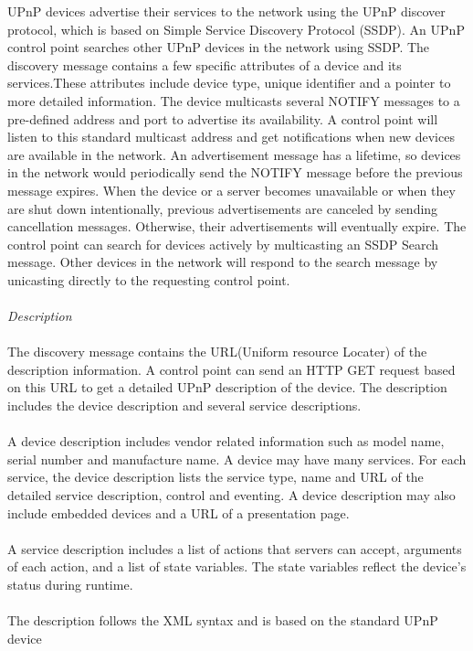 UPnP devices advertise their services to the network using the UPnP discover protocol, which is based on 
Simple Service Discovery Protocol (SSDP). An UPnP control point searches other UPnP devices in the network using SSDP. The discovery message contains a few specific attributes 
of a device and its services.These attributes include device type, unique identifier and a 
pointer to more detailed information. The device multicasts several NOTIFY
messages to a pre-defined address and port to advertise its availability. A control point will listen to this standard multicast address and get 
notifications when new devices are available in the network. 
An advertisement message has a lifetime, so devices in the network would periodically send 
the NOTIFY message before the previous message expires. When the device or a server becomes unavailable or when they are shut down intentionally, previous advertisements are canceled by sending cancellation messages. Otherwise, their advertisements will eventually expire. 
The control point can search for devices actively by multicasting an SSDP Search message. Other devices 
in the network will respond to the search message by unicasting directly to the
requesting control point. \\
\\
\emph{Description} \\
\\ 
The discovery message contains the URL(Uniform resource Locater) of the
description information. A control point can send an HTTP GET request based on
this URL to get a detailed UPnP description of the device. The description includes the device description and several service descriptions. \\
\\
A device description includes vendor related information such as model name,
 serial number and manufacture name. A device may have many services. For each service, the device description lists 
the service type, name and URL of the detailed service description, control and eventing. A device 
description may also include embedded devices and a URL of a presentation
page.\\
\\
A service description includes a list of actions that servers can accept, arguments of each action, 
and a list of state variables. The state variables reflect the device's status
during runtime. \\
\\
The description follows the XML syntax and is based on the standard UPnP device
